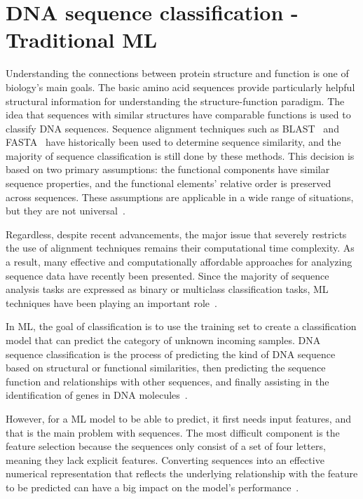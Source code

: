 \section{DNA sequence classification - Traditional ML}

Understanding the connections between protein structure and function is one of biology's main goals. The basic amino acid sequences provide particularly helpful structural information for understanding the structure-function paradigm. The idea that sequences with similar structures have comparable functions is used to classify \gls{DNA} sequences. Sequence alignment techniques such as BLAST~\cite{Altschul1990BasicTool} and FASTA~\cite{Pearson1988ImprovedComparison} have historically been used to determine sequence similarity, and the majority of sequence classification is still done by these methods. This decision is based on two primary assumptions: the functional components have similar sequence properties, and the functional elements' relative order is preserved across sequences. These assumptions are applicable in a wide range of situations, but they are not universal~\cite{LoBosco2017DeepClassification}.

Regardless, despite recent advancements, the major issue that severely restricts the use of alignment techniques remains their computational time complexity. As a result, many effective and computationally affordable approaches for analyzing sequence data have recently been presented. Since the majority of sequence analysis tasks are expressed as binary or multiclass classification tasks, \gls{ML} techniques have been playing an important role~\cite{Liu2017BioSeq-Analysis:Approaches}.

In \gls{ML}, the goal of classification is to use the training set to create a classification model that can predict the category of unknown incoming samples. \gls{DNA} sequence classification is the process of predicting the kind of \gls{DNA} sequence based on structural or functional similarities, then predicting the sequence function and relationships with other sequences, and finally assisting in the identification of genes in \gls{DNA} molecules~\cite{Yang2020ReviewDNA}.

However, for a \gls{ML} model to be able to predict, it first needs input features, and that is the main problem with sequences. The most difficult component is the feature selection because the sequences only consist of a set of four letters, meaning they lack explicit features. Converting sequences into an effective numerical representation that reflects the underlying relationship with the feature to be predicted can have a big impact on the model's performance~\cite{LoBosco2017DeepClassification,Chen2019ILearn:Data}.

